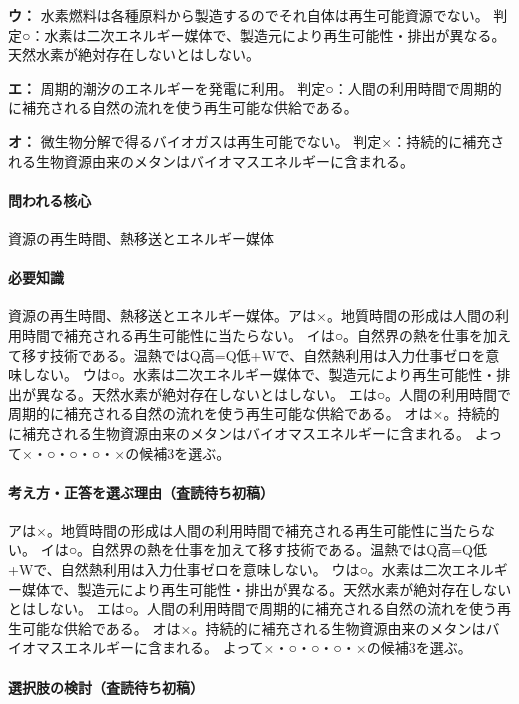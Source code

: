 \noindent\textbf{ウ：} 水素燃料は各種原料から製造するのでそれ自体は再生可能資源でない。 判定○：水素は二次エネルギー媒体で、製造元により再生可能性・排出が異なる。天然水素が絶対存在しないとはしない。\par

\noindent\textbf{エ：} 周期的潮汐のエネルギーを発電に利用。 判定○：人間の利用時間で周期的に補充される自然の流れを使う再生可能な供給である。\par

\noindent\textbf{オ：} 微生物分解で得るバイオガスは再生可能でない。 判定×：持続的に補充される生物資源由来のメタンはバイオマスエネルギーに含まれる。\par

\paragraph{問われる核心} 資源の再生時間、熱移送とエネルギー媒体

\paragraph{必要知識} 資源の再生時間、熱移送とエネルギー媒体。アは×。地質時間の形成は人間の利用時間で補充される再生可能性に当たらない。 イは○。自然界の熱を仕事を加えて移す技術である。温熱ではQ高=Q低+Wで、自然熱利用は入力仕事ゼロを意味しない。 ウは○。水素は二次エネルギー媒体で、製造元により再生可能性・排出が異なる。天然水素が絶対存在しないとはしない。 エは○。人間の利用時間で周期的に補充される自然の流れを使う再生可能な供給である。 オは×。持続的に補充される生物資源由来のメタンはバイオマスエネルギーに含まれる。 よって×・○・○・○・×の候補3を選ぶ。

\paragraph{考え方・正答を選ぶ理由（査読待ち初稿）} アは×。地質時間の形成は人間の利用時間で補充される再生可能性に当たらない。 イは○。自然界の熱を仕事を加えて移す技術である。温熱ではQ高=Q低+Wで、自然熱利用は入力仕事ゼロを意味しない。 ウは○。水素は二次エネルギー媒体で、製造元により再生可能性・排出が異なる。天然水素が絶対存在しないとはしない。 エは○。人間の利用時間で周期的に補充される自然の流れを使う再生可能な供給である。 オは×。持続的に補充される生物資源由来のメタンはバイオマスエネルギーに含まれる。 よって×・○・○・○・×の候補3を選ぶ。

\paragraph{選択肢の検討（査読待ち初稿）}\mbox{}\par

